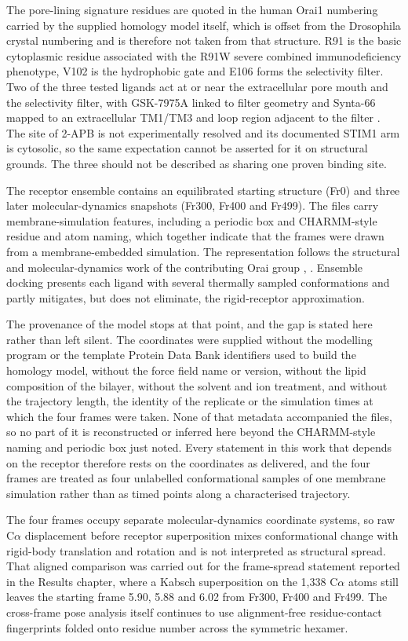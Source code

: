 The pore-lining signature residues are quoted in the human Orai1 numbering carried by the supplied homology model itself, which is offset from the Drosophila crystal numbering and is therefore not taken from that structure. R91 is the basic cytoplasmic residue associated with the R91W severe combined immunodeficiency phenotype, V102 is the hydrophobic gate and E106 forms the selectivity filter. Two of the three tested ligands act at or near the extracellular pore mouth and the selectivity filter, with GSK-7975A linked to filter geometry \cite{ref070} and Synta-66 mapped to an extracellular TM1/TM3 and loop region adjacent to the filter \cite{ref071}. The site of 2-APB is not experimentally resolved and its documented STIM1 arm is cytosolic, so the same expectation cannot be asserted for it on structural grounds. The three should not be described as sharing one proven binding site.

The receptor ensemble contains an equilibrated starting structure (Fr0) and three later molecular-dynamics snapshots (Fr300, Fr400 and Fr499). The files carry membrane-simulation features, including a periodic box and CHARMM-style residue and atom naming, which together indicate that the frames were drawn from a membrane-embedded simulation. The representation follows the structural and molecular-dynamics work of the contributing Orai group \cite{ref038}, \cite{ref072}. Ensemble docking presents each ligand with several thermally sampled conformations and partly mitigates, but does not eliminate, the rigid-receptor approximation.

The provenance of the model stops at that point, and the gap is stated here rather than left silent. The coordinates were supplied without the modelling program or the template Protein Data Bank identifiers used to build the homology model, without the force field name or version, without the lipid composition of the bilayer, without the solvent and ion treatment, and without the trajectory length, the identity of the replicate or the simulation times at which the four frames were taken. None of that metadata accompanied the files, so no part of it is reconstructed or inferred here beyond the CHARMM-style naming and periodic box just noted. Every statement in this work that depends on the receptor therefore rests on the coordinates as delivered, and the four frames are treated as four unlabelled conformational samples of one membrane simulation rather than as timed points along a characterised trajectory.

The four frames occupy separate molecular-dynamics coordinate systems, so raw C\ensuremath{\alpha} displacement before receptor superposition mixes conformational change with rigid-body translation and rotation and is not interpreted as structural spread. That aligned comparison was carried out for the frame-spread statement reported in the Results chapter, where a Kabsch superposition on the 1,338 C\ensuremath{\alpha} atoms still leaves the starting frame 5.90, 5.88 and 6.02 \angstrom{} from Fr300, Fr400 and Fr499. The cross-frame pose analysis itself continues to use alignment-free residue-contact fingerprints folded onto residue number across the symmetric hexamer.


